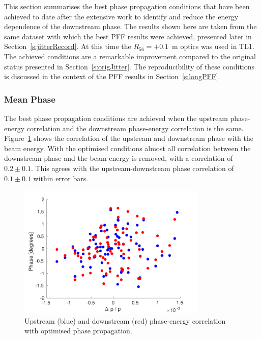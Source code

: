 

This section summarises the best phase propagation conditions that have been achieved to date after the extensive work to identify and reduce the energy dependence of the downstream phase. The results shown here are taken from the same dataset with which the best PFF results were achieved, presented later in Section~\ref{s:jitterRecord}. At this time the \(R_{56} = +0.1\)~m optics was used in TL1. The achieved conditions are a remarkable improvement compared to the original status presented in Section~\ref{s:origJitter}. The reproducibility of these conditions is discussed in the context of the PFF results in Section~\ref{s:longPFF}.

\subsubsection{Mean Phase}

The best phase propagation conditions are achieved when the upstream phase-energy correlation and the downstream phase-energy correlation is the same. Figure~\ref{f:bestProp_enCorr} shows the correlation of the upstream and downstream phase with the beam energy. With the optimised conditions almost all correlation between the downstream phase and the beam energy is removed, with a correlation of \(0.2\pm0.1\). This agrees with the upstream-downstream phase correlation of \(0.1\pm0.1\) within error bars.

\begin{figure}
  \centering
  \includegraphics[width=0.8\textwidth]{Figures/propagation/bestProp_enCorr}
  \caption{Upstream (blue) and downstream (red) phase-energy correlation with optimised phase propagation.}
  \label{f:bestProp_enCorr}
\end{figure}

